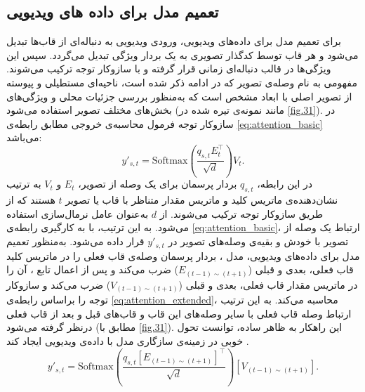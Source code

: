 \subsection{تعمیم مدل   برای داده های ویدیویی}
برای تعمیم مدل  برای داده‌های ویدیویی، ورودی ویدیویی به دنباله‌ای از قاب‌‌ها تبدیل می‌شود و هر قاب توسط کدگذار تصویری  به یک بردار ویژگی تبدیل می‌گردد. سپس این ویژگی‌ها در قالب دنباله‌ای زمانی قرار گرفته و با سازوکار توجه ترکیب می‌شوند. مفهومی به نام وصله‌ی تصویر که در ادامه ذکر شده است، ناحیه‌ای مستطیلی و پیوسته از تصویر اصلی با ابعاد مشخص است که به‌منظور بررسی جزئیات محلی و ویژگی‌های بخش‌های مختلف تصویر استفاده می‌شود (مانند نمونه‌ی تیره شده در \cref{fig.31}). در سازوکار توجه فرمول محاسبه‌ی خروجی مطابق رابطه‌ی \eqref{eq:attention_basic} می‌باشد:
\begin{equation}\label{eq:attention_basic}
	y'_{s,t} = \mathrm{Softmax}\left( \frac{q_{s,t} E_{t}^{\top}}{\sqrt{d}} \right) V_{t}.
\end{equation}
در این رابطه، $q_{s,t}$ بردار پرسمان برای یک وصله از تصویر، $E_t$ و $V_t$ به ترتیب نشان‌دهنده‌ی ماتریس کلید و  ماتریس مقدار متناظر با قاب یا تصویر $t$ هستند که از طریق سازوکار توجه ترکیب می‌شوند. از $d$ به‌عنوان عامل نرمال‌سازی استفاده می‌شود. به این ترتیب، با به کارگیری رابطه‌ی \eqref{eq:attention_basic}، ارتباط یک وصله از تصویر با خودش و بقیه‌ی وصله‌های تصویر در $y'_{s,t}$ قرار داده می‌شود. به‌منظور تعمیم مدل برای داده‌های ویدیویی، مدل ، بردار پرسمان وصله‌ی قاب فعلی را در ماتریس کلید قاب فعلی، بعدی و قبلی ($E_{(t-1)\sim(t+1)}$) ضرب می‌کند و پس از اعمال تابع ، آن را در ماتریس مقدار قاب فعلی، بعدی و قبلی ($V_{(t-1)\sim(t+1)}$) ضرب می‌کند و سازوکار توجه را براساس رابطه‌ی \eqref{eq:attention_extended}، محاسبه می‌کند. به این ترتیب ارتباط وصله قاب فعلی با سایر وصله‌های این قاب و قاب‌های قبل و بعد از قاب فعلی درنظر گرفته می‌شود (مطابق با \cref{fig.31}). این راهکار به ظاهر ساده، توانست تحول خوبی در زمینه‌ی سازگاری مدل  با داده‌ی ویدیویی ایجاد کند \cite{open-vclip}.
\begin{equation}\label{eq:attention_extended}
	y'_{s,t} = \mathrm{Softmax}\left( 
	\frac{q_{s,t} \left[ E_{(t-1)\sim(t+1)} \right]^{\top}}{\sqrt{d}} 
	\right) 
	\left[ V_{(t-1)\sim(t+1)} \right].
\end{equation}

